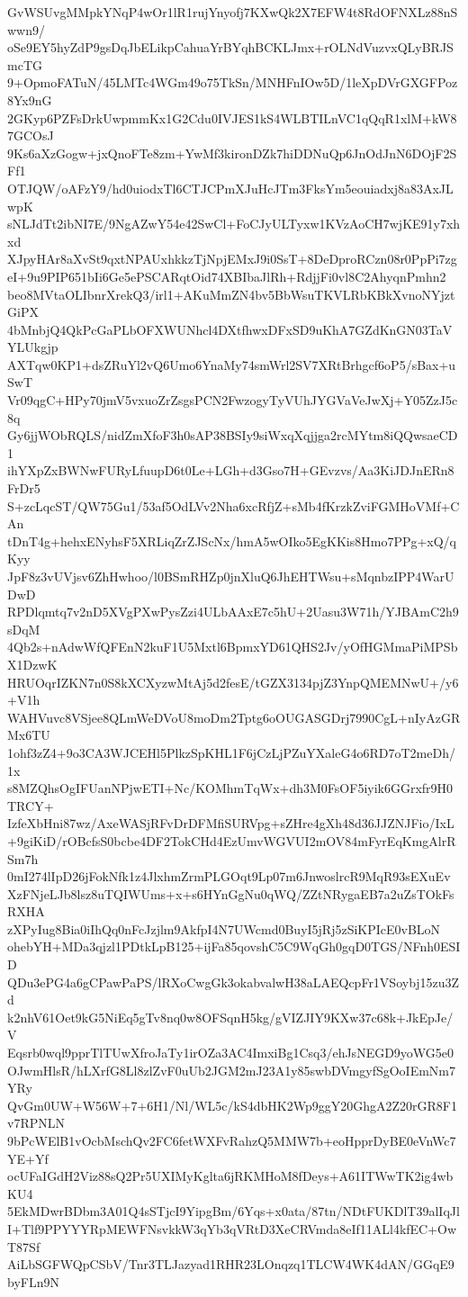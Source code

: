 GvWSUvgMMpkYNqP4wOr1lR1rujYnyofj7KXwQk2X7EFW4t8RdOFNXLz88nSwwn9/
oSe9EY5hyZdP9gsDqJbELikpCahuaYrBYqhBCKLJmx+rOLNdVuzvxQLyBRJSmcTG
9+OpmoFATuN/45LMTc4WGm49o75TkSn/MNHFnIOw5D/1leXpDVrGXGFPoz8Yx9nG
2GKyp6PZFsDrkUwpmmKx1G2Cdu0IVJES1kS4WLBTILnVC1qQqR1xlM+kW87GCOsJ
9Ks6aXzGogw+jxQnoFTe8zm+YwMf3kironDZk7hiDDNuQp6JnOdJnN6DOjF2SFf1
OTJQW/oAFzY9/hd0uiodxTl6CTJCPmXJuHcJTm3FksYm5eouiadxj8a83AxJLwpK
sNLJdTt2ibNI7E/9NgAZwY54e42SwCl+FoCJyULTyxw1KVzAoCH7wjKE91y7xhxd
XJpyHAr8aXvSt9qxtNPAUxhkkzTjNpjEMxJ9i0SsT+8DeDproRCzn08r0PpPi7zg
eI+9u9PIP651bIi6Ge5ePSCARqtOid74XBIbaJlRh+RdjjFi0vl8C2AhyqnPmhn2
beo8MVtaOLIbnrXrekQ3/irl1+AKuMmZN4bv5BbWsuTKVLRbKBkXvnoNYjztGiPX
4bMnbjQ4QkPcGaPLbOFXWUNhcl4DXtfhwxDFxSD9uKhA7GZdKnGN03TaVYLUkgjp
AXTqw0KP1+dsZRuYl2vQ6Umo6YnaMy74smWrl2SV7XRtBrhgcf6oP5/sBax+uSwT
Vr09qgC+HPy70jmV5vxuoZrZsgsPCN2FwzogyTyVUhJYGVaVeJwXj+Y05ZzJ5c8q
Gy6jjWObRQLS/nidZmXfoF3h0sAP38BSIy9siWxqXqjjga2rcMYtm8iQQwsaeCD1
ihYXpZxBWNwFURyLfuupD6t0Le+LGh+d3Gso7H+GEvzvs/Aa3KiJDJnERn8FrDr5
S+zcLqcST/QW75Gu1/53af5OdLVv2Nha6xcRfjZ+sMb4fKrzkZviFGMHoVMf+CAn
tDnT4g+hehxENyhsF5XRLiqZrZJScNx/hmA5wOIko5EgKKis8Hmo7PPg+xQ/qKyy
JpF8z3vUVjsv6ZhHwhoo/l0BSmRHZp0jnXluQ6JhEHTWsu+sMqnbzIPP4WarUDwD
RPDlqmtq7v2nD5XVgPXwPysZzi4ULbAAxE7c5hU+2Uasu3W71h/YJBAmC2h9sDqM
4Qb2s+nAdwWfQFEnN2kuF1U5Mxtl6BpmxYD61QHS2Jv/yOfHGMmaPiMPSbX1DzwK
HRUOqrIZKN7n0S8kXCXyzwMtAj5d2fesE/tGZX3134pjZ3YnpQMEMNwU+/y6+V1h
WAHVuvc8VSjee8QLmWeDVoU8moDm2Tptg6oOUGASGDrj7990CgL+nIyAzGRMx6TU
1ohf3zZ4+9o3CA3WJCEHl5PlkzSpKHL1F6jCzLjPZuYXaleG4o6RD7oT2meDh/1x
s8MZQhsOgIFUanNPjwETI+Nc/KOMhmTqWx+dh3M0FsOF5iyik6GGrxfr9H0TRCY+
IzfeXbHni87wz/AxeWASjRFvDrDFMfiSURVpg+sZHre4gXh48d36JJZNJFio/IxL
+9giKiD/rOBcfsS0bcbe4DF2TokCHd4EzUmvWGVUI2mOV84mFyrEqKmgAlrRSm7h
0mI274lIpD26jFokNfk1z4JlxhmZrmPLGOqt9Lp07m6JnwoslrcR9MqR93sEXuEv
XzFNjeLJb8lsz8uTQIWUms+x+s6HYnGgNu0qWQ/ZZtNRygaEB7a2uZsTOkFsRXHA
zXPyIug8Bia0iIhQq0nFcJzjlm9AkfpI4N7UWcmd0BuyI5jRj5zSiKPIcE0vBLoN
ohebYH+MDa3qjzl1PDtkLpB125+ijFa85qovshC5C9WqGh0gqD0TGS/NFnh0ESID
QDu3ePG4a6gCPawPaPS/lRXoCwgGk3okabvalwH38aLAEQcpFr1VSoybj15zu3Zd
k2nhV61Oet9kG5NiEq5gTv8nq0w8OFSqnH5kg/gVIZJIY9KXw37c68k+JkEpJe/V
Eqsrb0wql9pprTlTUwXfroJaTy1irOZa3AC4ImxiBg1Csq3/ehJsNEGD9yoWG5e0
OJwmHlsR/hLXrfG8Ll8zlZvF0uUb2JGM2mJ23A1y85swbDVmgyfSgOoIEmNm7YRy
QvGm0UW+W56W+7+6H1/Nl/WL5c/kS4dbHK2Wp9ggY20GhgA2Z20rGR8F1v7RPNLN
9bPcWElB1vOcbMschQv2FC6fetWXFvRahzQ5MMW7b+eoHpprDyBE0eVnWc7YE+Yf
ocUFaIGdH2Viz88sQ2Pr5UXIMyKglta6jRKMHoM8fDeys+A61ITWwTK2ig4wbKU4
5EkMDwrBDbm3A01Q4sSTjcI9YipgBm/6Yqs+x0ata/87tn/NDtFUKDlT39alIqJl
I+Tlf9PPYYYRpMEWFNsvkkW3qYb3qVRtD3XeCRVmda8eIf11ALl4kfEC+OwT87Sf
AiLbSGFWQpCSbV/Tnr3TLJazyad1RHR23LOnqzq1TLCW4WK4dAN/GGqE9byFLn9N

